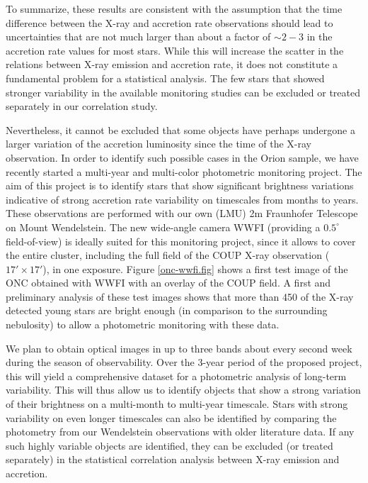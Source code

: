 \documentclass[10pt,fleqn,twoside]{article}
\begin{document}
To summarize, these
results are consistent with the assumption that the 
time difference between the
X-ray and accretion rate observations should lead to uncertainties
that are not much larger than about
a factor of $\sim 2-3$ in the accretion rate values for most stars.
While this will increase the scatter in the relations between
X-ray emission and accretion rate, it does not constitute a fundamental problem for
a statistical analysis.
%
The few stars that showed stronger variability in the available
monitoring studies can be excluded or treated separately
in our correlation study.

\medskip


Nevertheless, it cannot be excluded that some objects have
perhaps undergone a larger variation of the accretion luminosity
since the time of the X-ray observation.
In order to identify such possible cases in the Orion sample,
we have recently started a multi-year and multi-color
photometric monitoring project.
%
The aim of this project is to identify stars
that show significant brightness variations indicative of strong accretion rate variability
on timescales from months to years.
%
These observations are performed with our own (LMU) 2m Fraunhofer Telescope 
on Mount Wendelstein. 
The new wide-angle camera WWFI (providing a $0.5^\circ$ field-of-view) 
is ideally suited for this monitoring project, since it allows to cover
the entire cluster, including the full field of the COUP X-ray observation ($17' \times 17'$), in
one exposure. 
Figure \ref{onc-wwfi.fig} shows a first test image of the 
ONC obtained with WWFI with an overlay of the COUP field.
%
A first and preliminary  analysis of these test images shows that more than
450 of the X-ray detected young stars are bright enough (in comparison
to the surrounding nebulosity) to allow a photometric monitoring 
with these data.

We plan to obtain optical images in up to three bands 
about every second week during the season of observability.
Over the 3-year period of the proposed project, this will yield
a comprehensive dataset for a photometric analysis of long-term
variability.
This will thus
allow us to identify objects that show a strong
variation of their brightness on a multi-month to multi-year timescale.
Stars with strong variability on even longer timescales can also be
identified by comparing the photometry from our Wendelstein observations
with older literature data.
%
If any such highly variable objects are identified, they can be excluded
(or treated separately) in the statistical correlation analysis
between X-ray emission and accretion.
\end{document}
